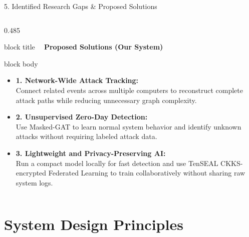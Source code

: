 \documentclass[aspectratio=169,10pt]{beamer}
\begin{document}
\begin{frame}[t]{5. Identified Research Gaps \& Proposed Solutions}
\begin{columns}[T]
\begin{column}{0.485\textwidth}
\begin{beamercolorbox}[rounded=true,shadow=false,sep=0.32em,wd=\linewidth]{block title}
\textbf{\scriptsize \textcolor{strengthGreen}{\textbullet\ } Proposed Solutions (Our System)}
\end{beamercolorbox}
\vspace{0.1em}
\begin{beamercolorbox}[rounded=true,shadow=false,sep=0.40em,wd=\linewidth]{block body}
{\fontsize{7.0pt}{9.6pt}\selectfont
\begin{itemize}\itemsep0.48em
  \item \textbf{1. Network-Wide Attack Tracking:}\\
  Connect related events across multiple computers to reconstruct complete attack paths while reducing unnecessary graph complexity.
  
  \item \textbf{2. Unsupervised Zero-Day Detection:}\\
  Use Masked-GAT to learn normal system behavior and identify unknown attacks without requiring labeled attack data.
  
  \item \textbf{3. Lightweight and Privacy-Preserving AI:}\\
  Run a compact model locally for fast detection and use TenSEAL CKKS-encrypted Federated Learning to train collaboratively without sharing raw system logs.
\end{itemize}
}
\end{beamercolorbox}
\end{column}
\end{columns}
\end{frame}

\section{System Design Principles}
\end{document}
